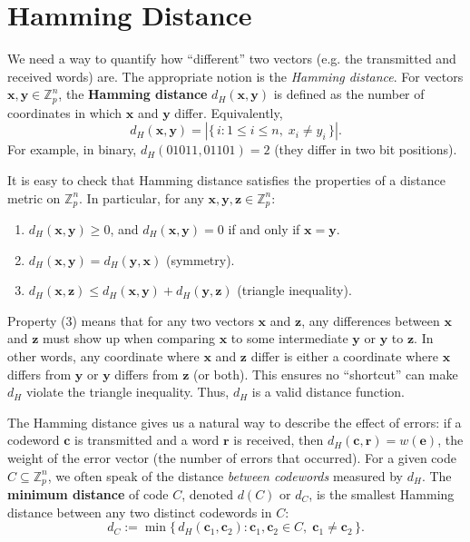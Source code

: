 \documentclass[docmute]{article}
\begin{document}
\section{Hamming Distance}

We need a way to quantify how “different” two vectors (e.g. the transmitted and received words) are. The appropriate notion is the \emph{Hamming distance}. For vectors $\mathbf{x}, \mathbf{y} \in \mathbb{Z}_p^n$, the \textbf{Hamming distance} $d_H(\mathbf{x}, \mathbf{y})$ is defined as the number of coordinates in which $\mathbf{x}$ and $\mathbf{y}$ differ. Equivalently, 
\[ d_H(\mathbf{x}, \mathbf{y}) = |\{\,i : 1 \le i \le n,\; x_i \neq y_i\,\}|.\] 
For example, in binary, $d_H(01011, 01101) = 2$ (they differ in two bit positions).

It is easy to check that Hamming distance satisfies the properties of a distance metric on $\mathbb{Z}_p^n$. In particular, for any $\mathbf{x}, \mathbf{y}, \mathbf{z} \in \mathbb{Z}_p^n$:

\begin{enumerate}
  \item $d_H(\mathbf{x}, \mathbf{y}) \ge 0$, and $d_H(\mathbf{x}, \mathbf{y}) = 0$ if and only if $\mathbf{x} = \mathbf{y}$.
  \item $d_H(\mathbf{x}, \mathbf{y}) = d_H(\mathbf{y}, \mathbf{x})$ \quad (symmetry).
  \item $d_H(\mathbf{x}, \mathbf{z}) \le d_H(\mathbf{x}, \mathbf{y}) + d_H(\mathbf{y}, \mathbf{z})$ \quad (triangle inequality).
\end{enumerate}

Property (3) means that for any two vectors $\mathbf{x}$ and $\mathbf{z}$, any differences between $\mathbf{x}$ and $\mathbf{z}$ must show up when comparing $\mathbf{x}$ to some intermediate $\mathbf{y}$ or $\mathbf{y}$ to $\mathbf{z}$. In other words, any coordinate where $\mathbf{x}$ and $\mathbf{z}$ differ is either a coordinate where $\mathbf{x}$ differs from $\mathbf{y}$ or $\mathbf{y}$ differs from $\mathbf{z}$ (or both). This ensures no “shortcut” can make $d_H$ violate the triangle inequality. Thus, $d_H$ is a valid distance function.

The Hamming distance gives us a natural way to describe the effect of errors: if a codeword $\mathbf{c}$ is transmitted and a word $\mathbf{r}$ is received, then $d_H(\mathbf{c}, \mathbf{r}) = w(\mathbf{e})$, the weight of the error vector (the number of errors that occurred). For a given code $C \subseteq \mathbb{Z}_p^n$, we often speak of the distance \emph{between codewords} measured by $d_H$. The \textbf{minimum distance} of code $C$, denoted $d(C)$ or $d_C$, is the smallest Hamming distance between any two distinct codewords in $C$:
\[ d_C := \min\{\,d_H(\mathbf{c}_1,\mathbf{c}_2) : \mathbf{c}_1, \mathbf{c}_2 \in C,\; \mathbf{c}_1 \neq \mathbf{c}_2\,\}.\]
\end{document}
